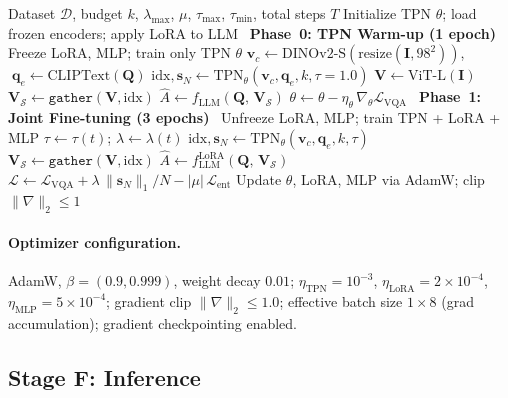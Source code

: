 \documentclass[11pt,a4paper]{article}
\newcommand{\vc}{\mathbf{v}_c}
\newcommand{\qe}{\mathbf{q}_e}
\newcommand{\vs}{\mathbf{s}}
\newcommand{\mI}{\mathbf{I}}
\newcommand{\mQ}{\mathbf{Q}}
\newcommand{\mV}{\mathbf{V}}
\begin{document}
\begin{algorithm}[t]
\caption{TC-ViTok Two-Phase Training (with Gather)}
\label{alg:training}
\begin{algorithmic}[1]
\Require Dataset $\mathcal{D}$, budget $k$, $\lambda_{\max}$, $\mu$,
  $\tau_{\max}$, $\tau_{\min}$, total steps $T$
\State Initialize TPN $\theta$; load frozen encoders; apply LoRA to LLM
\Statex \hrulefill\ \textbf{Phase~0: TPN Warm-up (1 epoch)}\ \hrulefill
\State Freeze LoRA, MLP; train only TPN $\theta$
\For{each $(\mI, \mQ, A)$ in $\mathcal{D}$}
  \State $\vc \gets \text{DINOv2-S}(\text{resize}(\mI,98^2))$,
    $\;\qe \gets \text{CLIPText}(\mQ)$
  \State $\text{idx}, \vs_N \gets \text{TPN}_\theta(\vc,\qe,k,\tau{=}1.0)$
  \State $\mV \gets \text{ViT-L}(\mI)$
  \State $\mV_\mathcal{S} \gets \texttt{gather}(\mV,\text{idx})$
  \State $\hat{A} \gets f_{\text{LLM}}(\mQ,\,\mV_\mathcal{S})$
  \State $\theta \gets \theta - \eta_\theta\,
    \nabla_\theta \mathcal{L}_{\text{VQA}}$
\EndFor
\Statex \hrulefill\ \textbf{Phase~1: Joint Fine-tuning (3 epochs)}\ \hrulefill
\State Unfreeze LoRA, MLP; train TPN + LoRA + MLP
  \State $\tau \gets \tau(t)$;\; $\lambda \gets \lambda(t)$
  \State $\text{idx}, \vs_N \gets \text{TPN}_\theta(\vc,\qe,k,\tau)$
  \State $\mV_\mathcal{S} \gets \texttt{gather}(\mV, \text{idx})$
  \State $\hat{A} \gets f_{\text{LLM}}^{\text{LoRA}}(\mQ,\,\mV_\mathcal{S})$
  \State $\mathcal{L} \gets \mathcal{L}_{\text{VQA}}
    + \lambda\,\|\vs_N\|_1/N - |\mu|\,\mathcal{L}_{\text{ent}}$
  \State Update $\theta$, LoRA, MLP via AdamW; clip $\|\nabla\|_2 \leq 1$
\EndFor
\end{algorithmic}
\end{algorithm}

\paragraph{Optimizer configuration.}
AdamW, $\beta{=}(0.9,0.999)$, weight decay $0.01$;
$\eta_{\text{TPN}}{=}10^{-3}$,
$\eta_{\text{LoRA}}{=}2{\times}10^{-4}$,
$\eta_{\text{MLP}}{=}5{\times}10^{-4}$;
gradient clip $\|\nabla\|_2 \leq 1.0$;
effective batch size $1{\times}8$ (grad accumulation);
gradient checkpointing enabled.

\subsection{Stage F: Inference}
\end{document}
